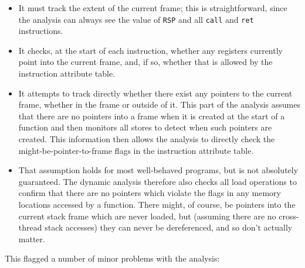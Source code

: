 \begin{itemize}
\item
  It must track the extent of the current frame; this is straightforward, since the analysis can always see the value of \verb|RSP| and all \verb|call| and \verb|ret| instructions.
\item
  It checks, at the start of each instruction, whether any registers currently point into the current frame, and, if so, whether that is allowed by the instruction attribute table.
\item
  It attempts to track directly whether there exist any pointers to the current frame, whether in the frame or outside of it.
  This part of the analysis assumes that there are no pointers into a frame when it is created at the start of a function and then monitors all stores to detect when such pointers are created.
  This information then allows the analysis to directly check the might-be-pointer-to-frame flags in the instruction attribute table.
\item
  That assumption holds for most well-behaved programs, but is not absolutely guaranteed.
  The dynamic analysis therefore also checks all load operations to confirm that there are no pointers which violate the flags in any memory locations accessed by a function.
  There might, of course, be pointers into the current stack frame which are never loaded, but (assuming there are no cross-thread stack accesses) they can never be dereferenced, and so don't actually matter.
\end{itemize}

This flagged a number of minor problems with the analysis:

